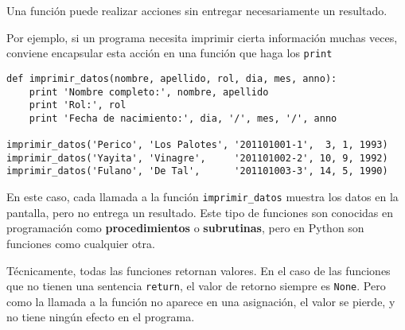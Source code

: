 Una función puede realizar acciones sin entregar necesariamente un
resultado.

Por ejemplo, si un programa necesita imprimir cierta información muchas
veces, conviene encapsular esta acción en una función que haga los
\lstinline!print!

\begin{lstlisting}
def imprimir_datos(nombre, apellido, rol, dia, mes, anno):
    print 'Nombre completo:', nombre, apellido
    print 'Rol:', rol
    print 'Fecha de nacimiento:', dia, '/', mes, '/', anno

imprimir_datos('Perico', 'Los Palotes', '201101001-1',  3, 1, 1993)
imprimir_datos('Yayita', 'Vinagre',     '201101002-2', 10, 9, 1992)
imprimir_datos('Fulano', 'De Tal',      '201101003-3', 14, 5, 1990)
\end{lstlisting}

En este caso, cada llamada a la función \lstinline!imprimir_datos!
muestra los datos en la pantalla, pero no entrega un resultado. Este
tipo de funciones son conocidas en programación como
\textbf{procedimientos} o \textbf{subrutinas}, pero en Python son
funciones como cualquier otra.

Técnicamente, todas las funciones retornan valores. En el caso de las
funciones que no tienen una sentencia \lstinline!return!, el valor de
retorno siempre es \lstinline!None!. Pero como la llamada a la función
no aparece en una asignación, el valor se pierde, y no tiene ningún
efecto en el programa.
